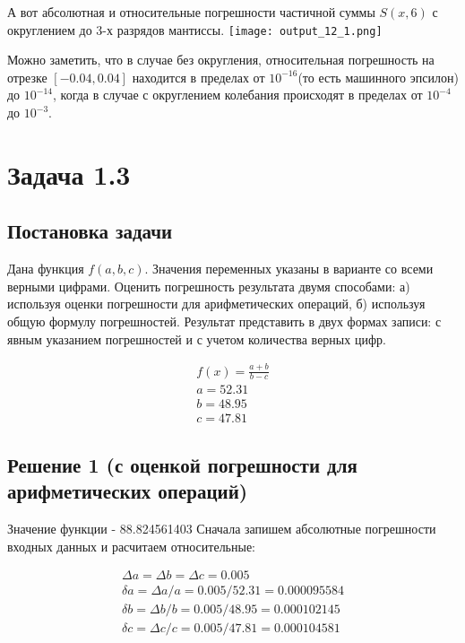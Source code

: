 \documentclass[a4paper,12pt]{report} %
\begin{document}
А вот абсолютная и относительные погрешности частичной суммы  $S(x, 6)$ с округлением до 3-х разрядов мантиссы.\newline
\noindent\texttt{[image: output\_12\_1.png]}

Можно заметить, что в случае без округления, относительная погрешность на отрезке $[-0.04, 0.04]$ находится в пределах от $10^{-16}$(то есть машинного эпсилон) до $10^{-14}$, когда в случае с округлением колебания происходят в пределах от $10^{-4}$ до $10^{-3}$.

\newpage
\section*{Задача 1.3}
\subsection*{Постановка задачи}

Дана функция $f(a, b, c)$. Значения переменных указаны в варианте со всеми верными цифрами. Оценить погрешность результата двумя способами: а) используя оценки погрешности для арифметических операций, б) используя общую формулу погрешностей. Результат представить в двух формах записи: с явным указанием погрешностей и с учетом количества верных цифр.

\begin{gather*}
	f(x) = \frac{a + b}{b - c}\\
	a = 52.31\\
	b = 48.95\\
	c = 47.81
\end{gather*}

\subsection*{Решение 1 (с оценкой погрешности для арифметических операций)}

Значение функции - 88.824561403 \newline
Сначала запишем абсолютные погрешности входных данных и расчитаем относительные:

\begin{gather*}
	\Delta a =\Delta b = \Delta c = 0.005 \\
	\delta a = \Delta a / a = 0.005 / 52.31 = 0.000095584\\
	\delta b = \Delta b / b  = 0.005 / 48.95 = 0.000102145\\
	\delta c = \Delta c / c = 0.005 / 47.81 = 0.000104581\\
\end{gather*}
\end{document}

